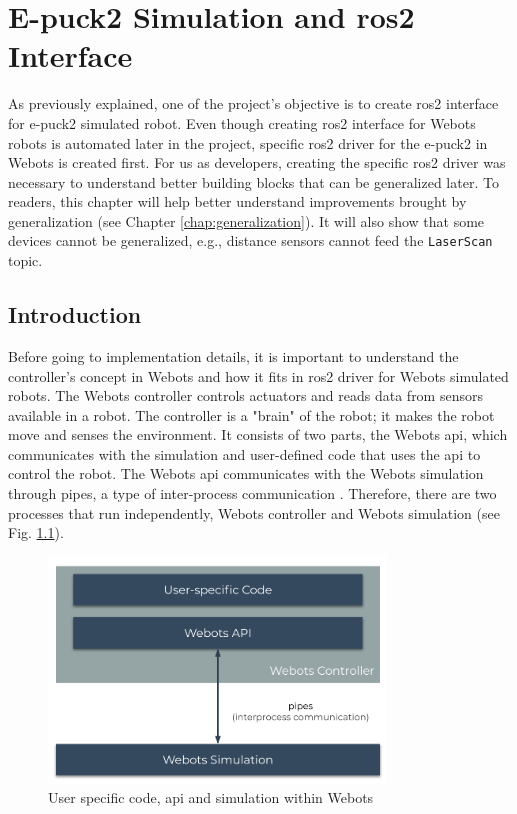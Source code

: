 \chapter{E-puck2 Simulation and \acs{ros2} Interface}
\label{chap:simulation}

As previously explained, one of the project's objective is to create \ac{ros2} interface for e-puck2 simulated robot. Even though creating \ac{ros2} interface for Webots robots is automated later in the project, specific \ac{ros2} driver for the e-puck2 in Webots is created first. For us as developers, creating the specific \ac{ros2} driver was necessary to understand better building blocks that can be generalized later. To readers, this chapter will help better understand improvements brought by generalization (see Chapter \ref{chap:generalization}). It will also show that some devices cannot be generalized, e.g., distance sensors cannot feed the \texttt{LaserScan} topic.

\section{Introduction}

Before going to implementation details, it is important to understand the controller's concept in Webots and how it fits in \ac{ros2} driver for Webots simulated robots. The Webots controller controls actuators and reads data from sensors available in a robot. The controller is a "brain" of the robot; it makes the robot move and senses the environment. It consists of two parts, the Webots \ac{api}, which communicates with the simulation and user-defined code that uses the \ac{api} to control the robot. The Webots \ac{api} communicates with the Webots simulation through pipes, a type of inter-process communication \cite{kashyian_portable_2008}. Therefore, there are two processes that run independently, Webots controller and Webots simulation (see Fig. \ref{fig:simulation:webots_user_code_and_api}).

\begin{figure}[H]
    \centering
    \includegraphics[width=0.8\textwidth]{simulation/figures/webots_user_code_and_api.pdf}
    \caption{User specific code, \ac{api} and simulation within Webots}
    \label{fig:simulation:webots_user_code_and_api}
\end{figure}

